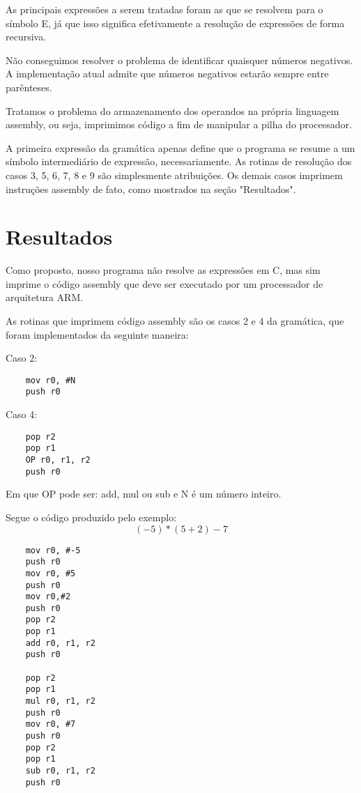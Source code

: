 \documentclass[a4paper, 11pt]{article}
\begin{document}
\begin{multicols*}{2}
\begin{multicols*}{2}
\end{multicols*}

As principais expressões a serem tratadas foram as que se resolvem para o símbolo E, já que isso significa efetivamente a resolução de expressões de forma recursiva.

Não conseguimos resolver o problema de identificar quaisquer números negativos. A implementação atual admite que números negativos estarão sempre entre parênteses.

Tratamos o problema do armazenamento dos operandos na própria linguagem assembly, ou seja, imprimimos código a fim de manipular a pilha do processador.

A primeira expressão da gramática apenas define que o programa se resume a um símbolo intermediário de expressão, necessariamente. As rotinas de resolução dos casos 3, 5, 6, 7, 8 e 9 são simplesmente atribuições. Os demais casos imprimem instruções assembly de fato, como mostrados na seção "Resultados".

\section*{Resultados}

Como proposto, nosso programa não resolve as expressões em C, mas sim imprime o código assembly que deve ser executado por um processador de arquitetura ARM.

As rotinas que imprimem código assembly são os casos 2 e 4 da gramática, que foram implementados da seguinte maneira:

\begin{multicols*}{2}
Caso 2:
\begin{verbatim}
    mov r0, #N
    push r0
\end{verbatim}

\vspace{2em}

Caso 4:
\begin{verbatim}
    pop r2
    pop r1
    OP r0, r1, r2
    push r0
\end{verbatim}

\end{multicols*}

Em que OP pode ser: add, mul ou sub e N é um número inteiro.

Segue o código produzido pelo exemplo: $$(-5)*(5 + 2) - 7$$

\begin{multicols*}{2}

\begin{verbatim}
    mov r0, #-5
    push r0
    mov r0, #5
    push r0
    mov r0,#2
    push r0
    pop r2
    pop r1
    add r0, r1, r2
    push r0

    pop r2
    pop r1
    mul r0, r1, r2
    push r0
    mov r0, #7
    push r0
    pop r2
    pop r1
    sub r0, r1, r2
    push r0
\end{verbatim}

\end{multicols*}

\end{multicols*}
\end{document}
